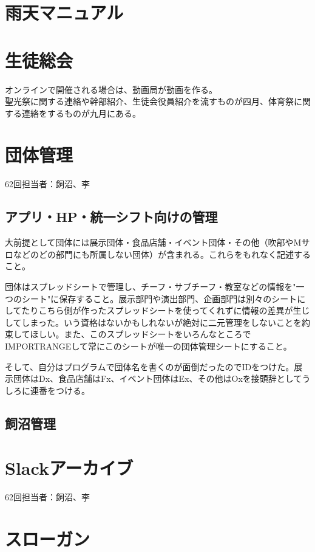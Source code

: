 \documentclass[dvipdfmx,jb5]{jarticle}
\begin{document}
 \section{雨天マニュアル}

 \section{生徒総会}
 オンラインで開催される場合は、動画局が動画を作る。\\
 聖光祭に関する連絡や幹部紹介、生徒会役員紹介を流すものが四月、体育祭に関する連絡をするものが九月にある。\\


 \section{団体管理}
 62回担当者：飼沼、李
  \subsection{アプリ・HP・統一シフト向けの管理}
 大前提として団体には展示団体・食品店舗・イベント団体・その他（吹部やMサロなどのどの部門にも所属しない団体）が含まれる。これらをもれなく記述すること。

 団体はスプレッドシートで管理し、チーフ・サブチーフ・教室などの情報を"一つのシート"に保存すること。展示部門や演出部門、企画部門は別々のシートにしてたりこちら側が作ったスプレッドシートを使ってくれずに情報の差異が生じしてしまった。いう資格はないかもしれないが絶対に二元管理をしないことを約束してほしい。また、このスプレッドシートをいろんなところでIMPORTRANGEして常にこのシートが唯一の団体管理シートにすること。

 そして、自分はプログラムで団体名を書くのが面倒だったのでIDをつけた。展示団体はDx、食品店舗はFx、イベント団体はEx、その他はOxを接頭辞としてうしろに連番をつける。
 \subsection{飼沼管理}

 \section{Slackアーカイブ}
 62回担当者：飼沼、李


 \section{スローガン}
\end{document}
